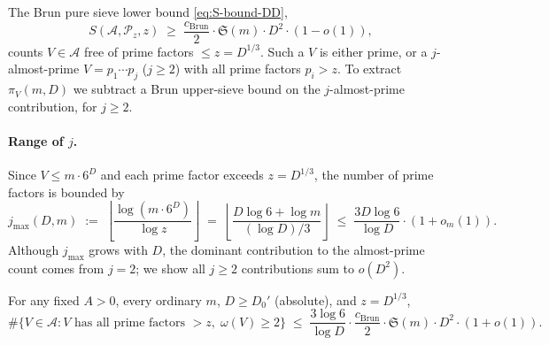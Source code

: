 The Brun pure sieve lower bound \eqref{eq:S-bound-DD},
\begin{equation}\label{eq:S-lower-recall}
  S(\mathcal{A}, \mathcal{P}_{z}, z)
    \;\geq\; \frac{c_{\mathrm{Brun}}}{2} \cdot \mathfrak{S}(m) \cdot D^{2}
    \cdot (1 - o(1)),
\end{equation}
counts $V \in \mathcal{A}$ free of prime factors $\leq z = D^{1/3}$.
Such a $V$ is either prime, or a $j$-almost-prime $V = p_{1} \cdots
p_{j}$ ($j \geq 2$) with all prime factors $p_{i} > z$. To extract
$\pi_{V}(m, D)$ we subtract a Brun upper-sieve bound on the
$j$-almost-prime contribution, for $j \geq 2$.

\paragraph{Range of $j$.} Since $V \leq m \cdot 6^{D}$ and each prime
factor exceeds $z = D^{1/3}$, the number of prime factors is bounded by
\begin{equation}\label{eq:j-bound}
  j_{\max}(D, m) \;:=\; \left\lfloor \frac{\log(m \cdot 6^{D})}{\log z}
    \right\rfloor
  \;=\; \left\lfloor \frac{D \log 6 + \log m}{(\log D)/3} \right\rfloor
  \;\leq\; \frac{3 D \log 6}{\log D} \cdot (1 + o_{m}(1)).
\end{equation}
Although $j_{\max}$ grows with $D$, the dominant contribution to the
almost-prime count comes from $j = 2$; we show all $j \geq 2$
contributions sum to $o(D^{2})$.

\begin{proposition}
\label{prop:almost-prime-upper}
For any fixed $A > 0$, every ordinary $m$, $D \geq D_{0}'$
(absolute), and $z = D^{1/3}$,
\begin{equation}\label{eq:upper-jge2}
  \#\bigl\{ V \in \mathcal{A} : V \text{ has all prime factors } > z,\;
    \omega(V) \geq 2 \bigr\}
  \;\leq\; \frac{3 \log 6}{\log D} \cdot
    \frac{c_{\mathrm{Brun}}}{2} \cdot \mathfrak{S}(m) \cdot D^{2}
    \cdot (1 + o(1)).
\end{equation}
\end{proposition}

